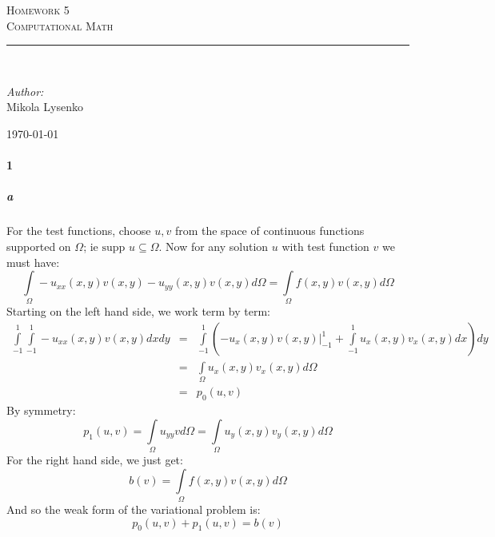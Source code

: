 \documentclass{article}
\newcommand{\HRule}{\rule{\linewidth}{0.5mm}}
\begin{document}

\begin{titlepage}
 
\begin{center}
 
\textsc{\LARGE Homework 5}\\[1.5cm] 

\textsc{\Large Computational Math}\\[0.5cm]
 
 
\HRule \\[2cm]
 
\begin{minipage}{0.4\textwidth}
\begin{flushleft} \large
\emph{Author:}\\
Mikola Lysenko
\end{flushleft}
\end{minipage}
 
\vfill
 
{\large \today}
 
\end{center}
 
\end{titlepage}


\paragraph{1}

\subparagraph{a}
For the test functions, choose $u,v$ from the space of continuous functions supported on $\Omega$; ie $\text{supp } u \subseteq \Omega$.  Now for any solution $u$ with test function $v$ we must have:
\[ \int \limits_{\Omega} - u_{xx}(x,y) v(x,y) - u_{yy}(x,y) v(x,y) d \Omega = \int \limits_{\Omega} f(x,y) v(x,y) d \Omega \]
Starting on the left hand side, we work term by term:
\begin{eqnarray*}
\int \limits_{-1}^{1} \int \limits_{-1}^{1} -u_{xx}(x,y) v(x,y) dx dy & = &
\int \limits_{-1}^{1} \left( -u_x(x,y) v(x,y) |_{-1}^{1} + \int \limits_{-1}^{1} u_{x}(x,y) v_{x}(x,y) dx \right) dy \\
& = & \int \limits_{\Omega} u_{x}(x,y) v_{x}(x,y) d \Omega \\
& = & p_0(u, v)
\end{eqnarray*}
By symmetry:
\[ p_1(u,v) = \int \limits_{\Omega} u_{yy} v d \Omega = \int \limits_{\Omega} u_{y}(x,y) v_{y}(x,y) d \Omega \]
For the right hand side, we just get:
\[ b(v) = \int \limits_{\Omega} f(x,y) v(x,y) d \Omega \]
And so the weak form of the variational problem is:
\[ p_0(u,v) + p_1(u,v) = b(v) \]
\end{document}
